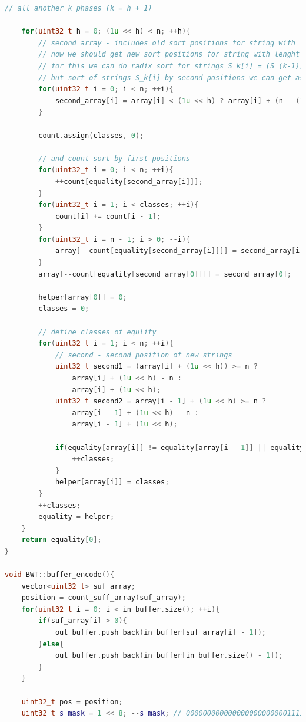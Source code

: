 \begin{lstlisting}[language=C++]
    // all another k phases (k = h + 1)

    for(uint32_t h = 0; (1u << h) < n; ++h){
        // second_array - includes old sort positions for string with lenght 2^(k-1)
        // now we should get new sort positions for string with lenght 2^(k)
        // for this we can do radix sort for strings S_k[i] = (S_(k-1)[i], S_(k-1)[i+2^(k-1)])
        // but sort of strings S_k[i] by second positions we can get as second_array[i] = p[i] - 2^(k-1) 
        for(uint32_t i = 0; i < n; ++i){
            second_array[i] = array[i] < (1u << h) ? array[i] + (n - (1 << h)) : array[i] - (1 << h);
        }

        count.assign(classes, 0);

        // and count sort by first positions
        for(uint32_t i = 0; i < n; ++i){
            ++count[equality[second_array[i]]];
        }
        for(uint32_t i = 1; i < classes; ++i){
            count[i] += count[i - 1];
        }
        for(uint32_t i = n - 1; i > 0; --i){
            array[--count[equality[second_array[i]]]] = second_array[i];
        }
        array[--count[equality[second_array[0]]]] = second_array[0];

        helper[array[0]] = 0;
        classes = 0;

        // define classes of equlity
        for(uint32_t i = 1; i < n; ++i){
            // second - second position of new strings
            uint32_t second1 = (array[i] + (1u << h)) >= n ? 
                array[i] + (1u << h) - n : 
                array[i] + (1u << h); 
            uint32_t second2 = array[i - 1] + (1u << h) >= n ? 
                array[i - 1] + (1u << h) - n : 
                array[i - 1] + (1u << h);

            if(equality[array[i]] != equality[array[i - 1]] || equality[second1] != equality[second2]){
                ++classes;
            }
            helper[array[i]] = classes;
        }
        ++classes;
        equality = helper;
    }
    return equality[0];
}

void BWT::buffer_encode(){
    vector<uint32_t> suf_array;
    position = count_suff_array(suf_array);
    for(uint32_t i = 0; i < in_buffer.size(); ++i){
        if(suf_array[i] > 0){
            out_buffer.push_back(in_buffer[suf_array[i] - 1]);
        }else{
            out_buffer.push_back(in_buffer[in_buffer.size() - 1]);
        }
    }

    uint32_t pos = position;
    uint32_t s_mask = 1 << 8; --s_mask; // 00000000000000000000000011111111


\end{lstlisting}
